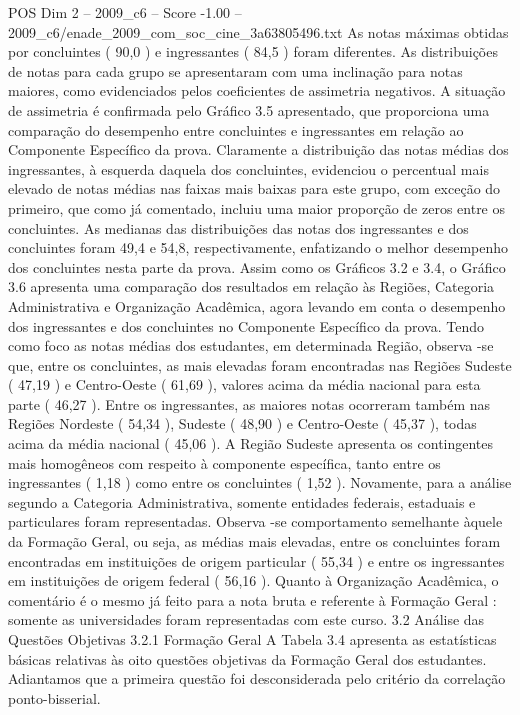 \begin{textsample}{POS Dim 2 – 2009\_c6 – Score -1.00 – 2009\_c6/enade\_2009\_com\_soc\_cine\_3a63805496.txt}
As notas máximas obtidas por concluintes ( 90,0 ) e ingressantes ( 84,5 ) foram diferentes.
As distribuições de notas para cada grupo se apresentaram com uma inclinação para notas maiores, como evidenciados pelos coeficientes de assimetria negativos.
A situação de assimetria é confirmada pelo Gráfico 3.5 apresentado, que proporciona uma comparação do desempenho entre concluintes e ingressantes em relação ao Componente Específico da prova.
Claramente a distribuição das notas médias dos ingressantes, à esquerda daquela dos concluintes, evidenciou o percentual mais elevado de notas médias nas faixas mais baixas para este grupo, com exceção do primeiro, que como já comentado, incluiu uma maior proporção de zeros entre os concluintes.
As medianas das distribuições das notas dos ingressantes e dos concluintes foram 49,4 e 54,8, respectivamente, enfatizando o melhor desempenho dos concluintes nesta parte da prova.
Assim como os Gráficos 3.2 e 3.4, o Gráfico 3.6 apresenta uma comparação dos resultados em relação às Regiões, Categoria Administrativa e Organização Acadêmica, agora levando em conta o desempenho dos ingressantes e dos concluintes no Componente Específico da prova.
Tendo como foco as notas médias dos estudantes, em determinada Região, observa -se que, entre os concluintes, as mais elevadas foram encontradas nas Regiões Sudeste ( 47,19 ) e Centro-Oeste ( 61,69 ), valores acima da média nacional para esta parte ( 46,27 ).
Entre os ingressantes, as maiores notas ocorreram também nas Regiões Nordeste ( 54,34 ), Sudeste ( 48,90 ) e Centro-Oeste ( 45,37 ), todas acima da média nacional ( 45,06 ).
A Região Sudeste apresenta os contingentes mais homogêneos com respeito à componente específica, tanto entre os ingressantes ( 1,18 ) como entre os concluintes ( 1,52 ).
Novamente, para a análise segundo a Categoria Administrativa, somente entidades federais, estaduais e particulares foram representadas.
Observa -se comportamento semelhante àquele da Formação Geral, ou seja, as médias mais elevadas, entre os concluintes foram encontradas em instituições de origem particular ( 55,34 ) e entre os ingressantes em instituições de origem federal ( 56,16 ).
Quanto à Organização Acadêmica, o comentário é o mesmo já feito para a nota bruta e referente à Formação Geral : somente as universidades foram representadas com este curso. 3.2 Análise das Questões Objetivas 3.2.1 Formação Geral A Tabela 3.4 apresenta as estatísticas básicas relativas às oito questões objetivas da Formação Geral dos estudantes.
Adiantamos que a primeira questão foi desconsiderada pelo critério da correlação ponto-bisserial.

\end{textsample}
